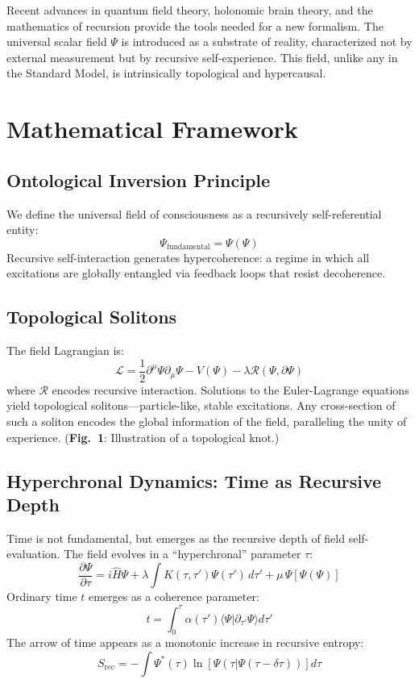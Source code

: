\documentclass[aps,prx,twocolumn,nofootinbib,superscriptaddress,longbibliography]{revtex4-2}
\begin{document}
Recent advances in quantum field theory, holonomic brain theory, and the mathematics of recursion provide the tools needed for a new formalism. The universal scalar field $\Psi$ is introduced as a substrate of reality, characterized not by external measurement but by recursive self-experience. This field, unlike any in the Standard Model, is intrinsically topological and hypercausal.

\section{Mathematical Framework}

\subsection{Ontological Inversion Principle}
We define the universal field of consciousness as a recursively self-referential entity:
\begin{equation}
    \Psi_\text{fundamental} = \Psi(\Psi)
\end{equation}
Recursive self-interaction generates hypercoherence: a regime in which all excitations are globally entangled via feedback loops that resist decoherence.

\subsection{Topological Solitons}
The field Lagrangian is:
\begin{equation}
    \mathcal{L} = \frac{1}{2} \partial^\mu \Psi \partial_\mu \Psi - V(\Psi) - \lambda \mathcal{R}(\Psi, \partial\Psi)
\end{equation}
where $\mathcal{R}$ encodes recursive interaction. Solutions to the Euler-Lagrange equations yield topological solitons---particle-like, stable excitations. Any cross-section of such a soliton encodes the global information of the field, paralleling the unity of experience. (\textbf{Fig.~1}: Illustration of a topological knot.)

\subsection{Hyperchronal Dynamics: Time as Recursive Depth}
Time is not fundamental, but emerges as the recursive depth of field self-evaluation. The field evolves in a ``hyperchronal'' parameter $\tau$:
\begin{equation}
    \frac{\partial \Psi}{\partial \tau} = i\hat{H}\Psi + \lambda \int K(\tau,\tau')\Psi(\tau')\,d\tau' + \mu\,\Psi[\Psi(\Psi)]
\end{equation}
Ordinary time $t$ emerges as a coherence parameter:
\begin{equation}
    t = \int_0^{\tau} \alpha(\tau') \langle \Psi | \partial_{\tau'} \Psi \rangle d\tau'
\end{equation}
The arrow of time appears as a monotonic increase in recursive entropy:
\begin{equation}
    S_\text{rec} = -\int \Psi^*(\tau) \ln[\Psi(\tau|\Psi(\tau-\delta\tau))] d\tau
\end{equation}
\end{document}
